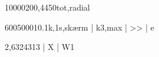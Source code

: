 \documentclass[a4paper,oneside,10pt,danish]{report}
\begin{document}
\begin{HV-lækstrøm-pr-fase}{10000}{20}{0,44}{50}{tot,radial}
\end{HV-lækstrøm-pr-fase}


\begin{KB-kontrol-strøm}{600}{5000}{1}{0.1}{k,1s,skærm | k3,max | >> | e }
\end{KB-kontrol-strøm}

\begin{KB-kontrol-energi}{2,6}{3}{243}{13}{  | X | W1 }
\end{KB-kontrol-energi}
\end{document}
